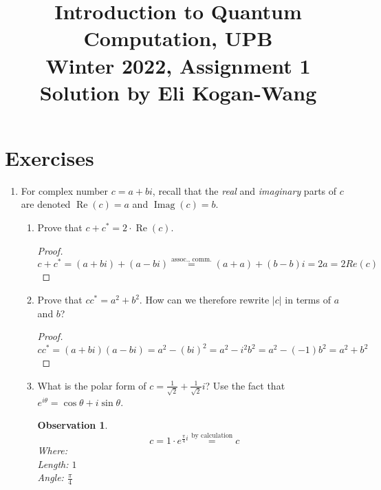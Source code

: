 \documentclass{article}
\newtheorem{observation}[theorem]{Observation}
\newcommand{\abs}[1]{\left\lvert #1 \right\rvert}
\begin{document}
\title{\vspace{-10mm}Introduction to Quantum Computation, UPB\\Winter 2022, Assignment 1\\{\large Solution by Eli Kogan-Wang}}
\date{}
\maketitle

\section{Exercises}
\begin{enumerate}
  \item %
        For complex number $c=a+bi$, recall that the \emph{real} and \emph{imaginary} parts of $c$ are denoted $\operatorname{Re}(c)=a$ and $\operatorname{Imag}(c)=b$.
        \begin{enumerate}
          \item %
                Prove that $c+c^\ast=2\cdot \operatorname{Re}(c)$.

                \begin{proof}
                  \begin{equation}
                    c+c^\ast = (a+bi) + (a-bi) \overset{\text{assoc., comm.}}{=}
                    (a + a) + (b - b)i = 2a = 2Re(c)
                  \end{equation}
                \end{proof}
          \item %
                Prove that $cc^\ast={a}^2+{b}^2$. How can we therefore rewrite $\abs{c}$ in terms of $a$ and $b$?

                \begin{proof}
                  \begin{equation}
                    cc^\ast=(a+bi)(a-bi)=a^2-(bi)^2=a^2-i^2b^2=a^2-(-1)b^2=a^2+b^2
                  \end{equation}
                \end{proof}
          \item %
                What is the polar form of $c=\frac{1}{\sqrt{2}}+\frac{1}{\sqrt{2}}i$? Use the fact that $e^{i\theta}=\cos\theta+i\sin\theta$.
                \begin{observation}
                  $$c=1\cdot e^{\frac{\pi}{4}i}\overset{\text{by calculation}}{=}c$$
                  Where:\\
                  Length: $1$\\
                  Angle: $\frac{\pi}{4}$
                \end{observation}


\end{enumerate}
\end{enumerate}
\end{document}
